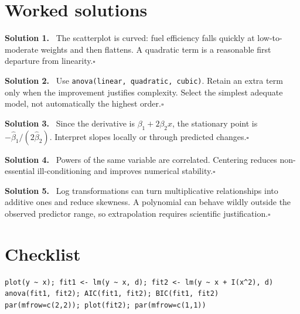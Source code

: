 \documentclass[11pt]{article}
\newenvironment{answer}[1]{\par\medskip\noindent\color{green}\textbf{Solution #1.}\color{black}\ }{\hfill$\square$\par\medskip}
\begin{document}
\section{Worked solutions}
\begin{answer}{1} The scatterplot is curved: fuel efficiency falls quickly at low-to-moderate weights and then flattens. A quadratic term is a reasonable first departure from linearity.\end{answer}
\begin{answer}{2} Use \texttt{anova(linear, quadratic, cubic)}. Retain an extra term only when the improvement justifies complexity. Select the simplest adequate model, not automatically the highest order.\end{answer}
\begin{answer}{3} Since the derivative is $\beta_1+2\beta_2x$, the stationary point is $-\hat\beta_1/(2\hat\beta_2)$. Interpret slopes locally or through predicted changes.\end{answer}
\begin{answer}{4} Powers of the same variable are correlated. Centering reduces non-essential ill-conditioning and improves numerical stability.\end{answer}
\begin{answer}{5} Log transformations can turn multiplicative relationships into additive ones and reduce skewness. A polynomial can behave wildly outside the observed predictor range, so extrapolation requires scientific justification.\end{answer}
\section*{Checklist}
\begin{lstlisting}
plot(y ~ x); fit1 <- lm(y ~ x, d); fit2 <- lm(y ~ x + I(x^2), d)
anova(fit1, fit2); AIC(fit1, fit2); BIC(fit1, fit2)
par(mfrow=c(2,2)); plot(fit2); par(mfrow=c(1,1))
\end{lstlisting}
\end{document}
